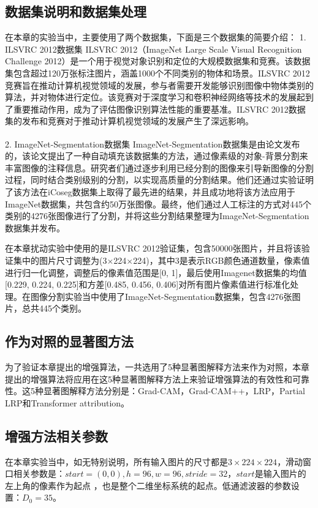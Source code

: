 \subsection{数据集说明和数据集处理}
在本章的实验当中，主要使用了两个数据集，下面是三个数据集的简要介绍：
1. ILSVRC 2012数据集
ILSVRC 2012（ImageNet Large Scale Visual Recognition Challenge 2012）是一个用于视觉对象识别和定位的大规模数据集和竞赛。该数据集包含超过120万张标注图片，涵盖1000个不同类别的物体和场景。ILSVRC 2012竞赛旨在推动计算机视觉领域的发展，参与者需要开发能够识别图像中物体类别的算法，并对物体进行定位。该竞赛对于深度学习和卷积神经网络等技术的发展起到了重要推动作用，成为了评估图像识别算法性能的重要基准。ILSVRC 2012数据集的发布和竞赛对于推动计算机视觉领域的发展产生了深远影响。

2. ImageNet-Segmentation数据集
ImageNet-Segmentation数据集是由论文\textsuperscript{\cite{guillaumin2014imagenet}}发布的，该论文提出了一种自动填充该数据集的方法，通过像素级的对象-背景分割来丰富图像的注释信息。研究者们通过逐步利用已经分割的图像来引导新图像的分割过程，同时结合类别级别的分割，以实现高质量的分割结果。他们还通过实验证明了该方法在iCoseg数据集上取得了最先进的结果，并且成功地将该方法应用于ImageNet数据集，共包含约50万张图像。最终，他们通过人工标注的方式对445个类别的4276张图像进行了分割，并将这些分割结果整理为ImageNet-Segmentation数据集并发布。

在本章扰动实验中使用的是ILSVRC 2012验证集，包含50000张图片，并且将该验证集中的图片尺寸调整为(3$\times$224$\times$224)，其中$3$是表示RGB颜色通道数量，像素值进行归一化调整，调整后的像素值范围是[0, 1]，最后使用Imagenet数据集的均值[0.229, 0.224, 0.225]和方差[0.485, 0.456, 0.406]对所有图片像素值进行标准化处理。在图像分割实验当中使用了ImageNet-Segmentation数据集，包含4276张图片，总共445个类别。
\subsection{作为对照的显著图方法}
为了验证本章提出的增强算法，一共选用了5种显著图解释方法来作为对照，本章提出的增强算法将应用在这5种显著图解释方法上来验证增强算法的有效性和可靠性。这5种显著图解释方法分别是：Grad-CAM，Grad-CAM++，LRP，Partial LRP和Transformer attribution。


\subsection{增强方法相关参数}
在本章实验当中，如无特别说明，所有输入图片的尺寸都是$3\times224\times224$，滑动窗口相关参数是：$start=(0,0), h=96, w=96, stride=32$，$start$是输入图片的左上角的像素作为起点 ，也是整个二维坐标系统的起点。低通滤波器的参数设置：$D_0=35$。


